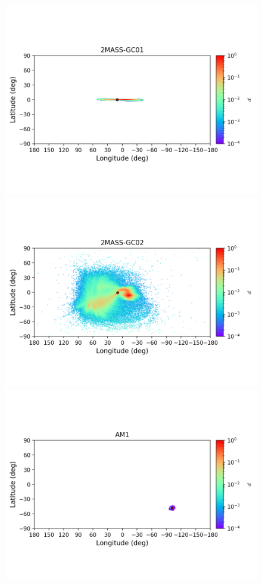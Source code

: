         \begin{figure}
        \includegraphics[clip=true, trim = 0mm 20mm 0mm 10mm, width=1\columnwidth]{images/error_plots_2MASS-GC01.png}
        \includegraphics[clip=true, trim = 0mm 20mm 0mm 10mm, width=1\columnwidth]{images/error_plots_2MASS-GC02.png}
        \includegraphics[clip=true, trim = 0mm 20mm 0mm 10mm, width=1\columnwidth]{images/error_plots_AM1.png}

\end{figure}
